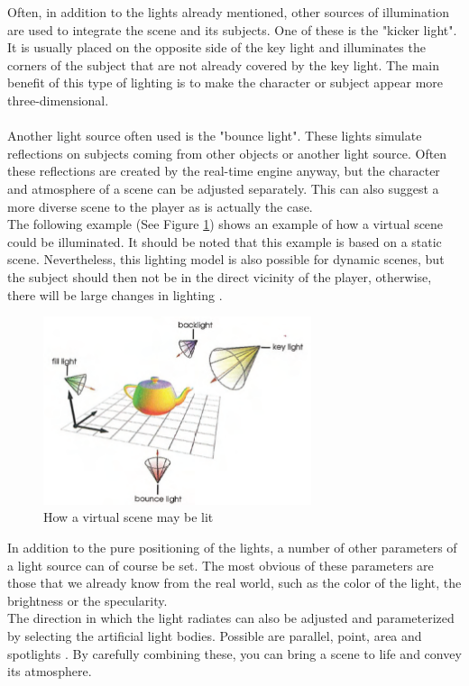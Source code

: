 Often, in addition to the lights already mentioned, other sources of illumination are used to integrate the scene and its subjects. One of these is the "kicker light". It is usually placed on the opposite side of the key light and illuminates the corners of the subject that are not already covered by the key light. The main benefit of this type of lighting is to make the character or subject appear more three-dimensional. \\\\
Another light source often used is the "bounce light". These lights simulate reflections on subjects coming from other objects or another light source. Often these reflections are created by the real-time engine anyway, but the character and atmosphere of a scene can be adjusted separately. This can also suggest a more diverse scene to the player as is actually the case. \\
The following example (See Figure \ref{fig:teapot}) shows an example of how a virtual scene could be illuminated. It should be noted that this example is based on a static scene. Nevertheless, this lighting model is also possible for dynamic scenes, but the subject should then not be in the direct vicinity of the player, otherwise, there will be large changes in lighting \cite{Niedenthal1404353}. 
\begin{figure}[H]
	\centering
		\includegraphics[width=0.7\textwidth]{Bilder/teapot.PNG}
	\caption{How a virtual scene may be lit \cite{Niedenthal1404353}}
	\label{fig:teapot}
\end{figure}
\newpage
In addition to the pure positioning of the lights, a number of other parameters of a light source can of course be set. The most obvious of these parameters are those that we already know from the real world, such as the color of the light, the brightness or the specularity. \\
The direction in which the light radiates can also be adjusted and parameterized by selecting the artificial light bodies. Possible are parallel, point, area and spotlights \cite{Shadowplay}. By carefully combining these, you can bring a scene to life and convey its atmosphere.\\
